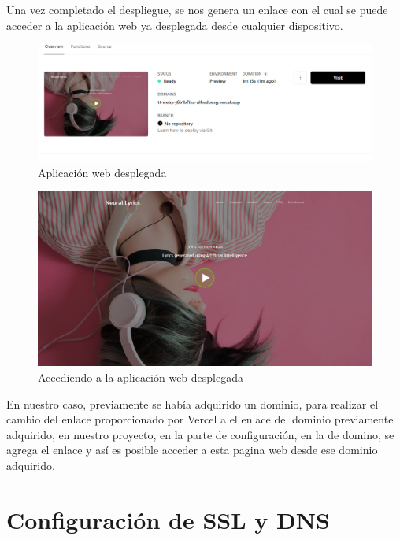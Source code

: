 \documentclass[12pt, a4paper, titlepage]{article}
\begin{document}
	Una vez completado el despliegue, se nos genera un enlace con el cual se puede acceder a la aplicación web ya desplegada desde cualquier dispositivo.
	\begin{figure}[H]
		\includegraphics[width=12cm]{./Imagenes/Despliegue/Desplegada.png}
		\centering 
		\caption{Aplicación web desplegada}
	\end{figure}
	\begin{figure}[H]
		\includegraphics[width=12cm]{./Imagenes/Despliegue/Paginaweb.png}
		\centering 
		\caption{Accediendo a la aplicación web desplegada}
	\end{figure}
	En nuestro caso, previamente se había adquirido un dominio, para realizar el cambio del enlace proporcionado por Vercel a el enlace del dominio previamente adquirido, en nuestro proyecto, en la parte de configuración, en la de domino, se agrega el enlace y así es posible acceder a esta pagina web desde ese dominio adquirido.
	\newpage
	\section{Configuración de SSL y DNS}
	
\end{document}
